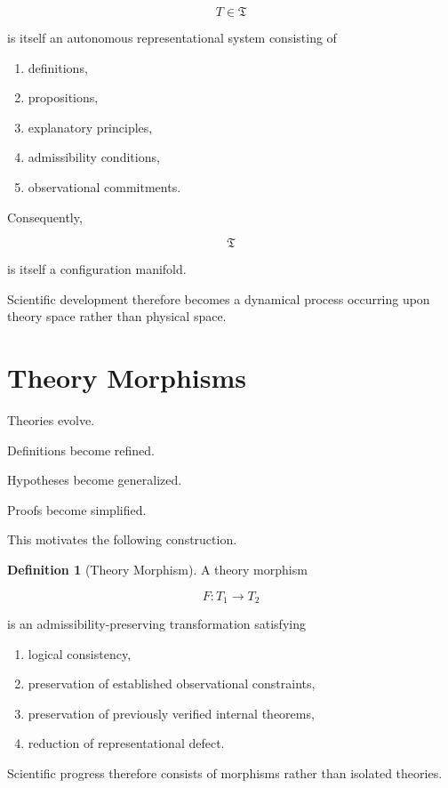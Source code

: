 \documentclass[11pt,oneside]{book}
\numberwithin{equation}{chapter}
\theoremstyle{definition}
\newtheorem{definition}{Definition}[chapter]
\theoremstyle{plain}
\begin{document}
\[
T\in\mathfrak{T}
\]

is itself an autonomous representational system consisting of

\begin{enumerate}
\item definitions,
\item propositions,
\item explanatory principles,
\item admissibility conditions,
\item observational commitments.
\end{enumerate}

Consequently,

\[
\mathfrak{T}
\]

is itself a configuration manifold.

Scientific development therefore becomes a dynamical process occurring upon
theory space rather than physical space.

\section{Theory Morphisms}

Theories evolve.

Definitions become refined.

Hypotheses become generalized.

Proofs become simplified.

This motivates the following construction.

\begin{definition}[Theory Morphism]

A theory morphism

\[
F:
T_1
\longrightarrow
T_2
\]

is an admissibility-preserving transformation satisfying

\begin{enumerate}
\item logical consistency,
\item preservation of established observational constraints,
\item preservation of previously verified internal theorems,
\item reduction of representational defect.
\end{enumerate}

\end{definition}

Scientific progress therefore consists of morphisms rather than isolated
theories.
\end{document}
